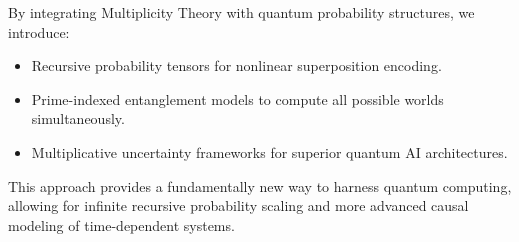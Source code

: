 \documentclass{article}
\theoremstyle{plain}
\begin{document}
By integrating Multiplicity Theory with quantum probability structures, we introduce:

\begin{itemize}
    \item Recursive probability tensors for nonlinear superposition encoding.
    \item Prime-indexed entanglement models to compute all possible worlds simultaneously.
    \item Multiplicative uncertainty frameworks for superior quantum AI architectures.
\end{itemize}

This approach provides a fundamentally new way to harness quantum computing, allowing for infinite recursive probability scaling and more advanced causal modeling of time-dependent systems.

\nocite{*}


\end{document}
